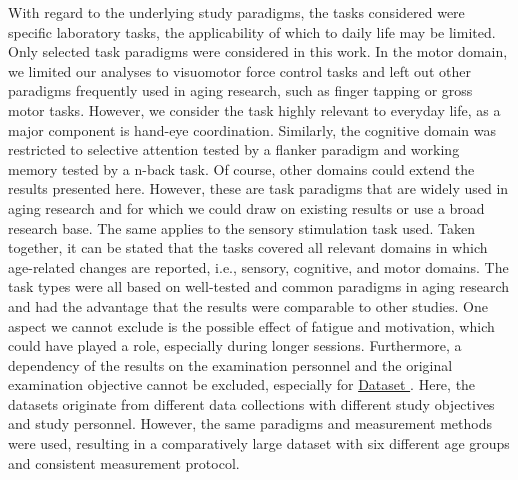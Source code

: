 With regard to the underlying study paradigms, the tasks considered were specific laboratory tasks, the applicability of which to daily life may be limited. Only selected task paradigms were considered in this work. In the motor domain, we limited our analyses to visuomotor force control tasks and left out other paradigms frequently used in aging research, such as finger tapping or gross motor tasks. However, we consider the task highly relevant to everyday life, as a major component is hand-eye coordination. Similarly, the cognitive domain was restricted to selective attention tested by a flanker paradigm and working memory tested by a n-back task. Of course, other domains could extend the results presented here. However, these are task paradigms that are widely used in aging research and for which we could draw on existing results or use a broad research base. The same applies to the sensory stimulation task used. Taken together, it can be stated that the tasks covered all relevant domains in which age-related changes are reported, i.e., sensory, cognitive, and motor domains. The task types were all based on well-tested and common paradigms in aging research and had the advantage that the results were comparable to other studies. One aspect we cannot exclude is the possible effect of fatigue and motivation, which could have played a role, especially during longer sessions. Furthermore, a dependency of the results on the examination personnel and the original examination objective cannot be excluded, especially for \hyperref[methods:datasets:II]{Dataset }. Here, the datasets originate from different data collections with different study objectives and study personnel. However, the same paradigms and measurement methods were used, resulting in a comparatively large dataset with six different age groups and consistent measurement protocol.\\
